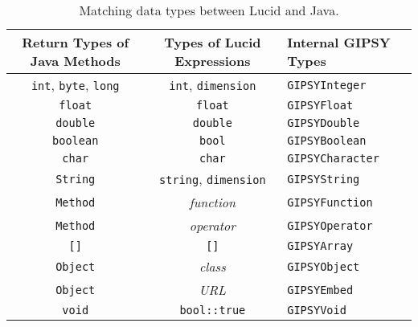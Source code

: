 \documentclass{easychair}
\newcommand{\api}[1]{\texttt{#1}\index{API!#1}}
\begin{document}
\begin{table*}[htb!]
\caption{Matching data types between Lucid and Java.}
\begin{minipage}[b]{\textwidth}
\begin{center}
\begin{tabular}{|c|c|l|} \hline
{\scriptsize Return Types of Java Methods}  & {\scriptsize Types of Lucid Expressions} & {\scriptsize Internal GIPSY Types}\\ \hline\hline
\api{int}, \api{byte}, \api{long}           & \api{int}, \api{dimension}               & \api{GIPSYInteger} \\
\api{float}                                 & \api{float}                              & \api{GIPSYFloat} \\
\api{double}                                & \api{double}                             & \api{GIPSYDouble} \\
\api{boolean}                               & \api{bool}                               & \api{GIPSYBoolean} \\
\api{char}                                  & \api{char}                               & \api{GIPSYCharacter} \\
\api{String}                                & \api{string}, \api{dimension}            & \api{GIPSYString} \\
\api{Method}                                & {\it function}                           & \api{GIPSYFunction} \\
\api{Method}                                & {\it operator}                           & \api{GIPSYOperator} \\
\api{[]}                                    & \api{[]}                                 & \api{GIPSYArray} \\
\api{Object}                                & {\it class}                              & \api{GIPSYObject} \\
\api{Object}                                & {\it URL}                                & \api{GIPSYEmbed} \\
\api{void}                                  & \api{bool::true}                         & \api{GIPSYVoid} \\ \hline\hline


\end{tabular}
\end{center}
\end{minipage}
\end{table*}
\end{document}
